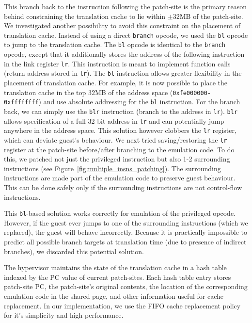 \documentclass[10pt,twocolumn]{article}
\begin{document}
This branch back to the instruction following the patch-site is
the primary reason behind constraining the translation cache to lie within
$\pm$32MB of the patch-site.
We investigated another possibility to avoid this constraint on the placement
of translation cache. Instead of using a direct {\tt branch} opcode, we used
the {\tt bl} opcode to jump to the translation cache. The {\tt bl} opcode is
identical to the {\tt branch} opcode, except that it additionally stores the
address of the following instruction in the link register {\tt lr}. This instruction
is meant to implement function calls (return address stored in {\tt lr}).
The {\tt bl} instruction
allows greater flexibility in the placement of translation cache. For example, it is
now possible to place the translation cache in the top 32MB of the address
space ({\tt 0xfe000000-0xffffffff}) and use absolute addressing for the {\tt bl}
instruction. For the branch back, we can simply use the {\tt blr}
instruction (branch to the address in {\tt lr}). {\tt blr} allows specification
of a full 32-bit address in {\tt lr} and can potentially jump anywhere in the
address space.
This solution however
clobbers the {\tt lr} register, which can deviate guest's behaviour.
We next tried saving/restoring the
{\tt lr} register at the patch-site before/after branching to the emulation code.
To do this, we patched not just the privileged instruction but also 1-2
surrounding instructions (see Figure~\ref{fig:multiple_insns_patching}). The
surrounding instructions are made part of the emulation code to preserve
guest behaviour. This can
be done safely only if the surrounding instructions are not control-flow instructions.

This {\tt bl}-based solution works correctly for emulation of the privileged opcode.
However, if the guest ever jumps to one of the surrounding instructions (which we
replaced), the guest will behave incorrectly.
Because it is practically impossible to predict all possible branch targets at
translation time (due to presence of indirect branches), we discarded this potential
solution.

The hypervisor maintains the state of the translation cache in
a hash table indexed by the PC value of current patch-sites. Each hash table
entry stores patch-site PC, the patch-site's original contents,
the location of the corresponding emulation code in the shared page, and other
information useful
for cache replacement. In our implementation, we use the FIFO cache replacement policy
for it's simplicity and high performance.
\end{document}
